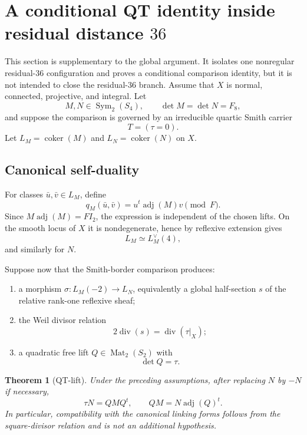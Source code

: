 \documentclass[11pt,reqno]{amsart}
\newtheorem{theorem}{Theorem}[section]
\theoremstyle{remark}
\newcommand{\adj}{\operatorname{adj}}
\newcommand{\Sym}{\operatorname{Sym}}
\newcommand{\divi}{\operatorname{div}}
\begin{document}
\section{A conditional QT identity inside residual distance $36$}\label{sec:QT}
This section is supplementary to the global argument.  It isolates one nonregular residual-$36$ configuration and proves a conditional comparison identity, but it is not intended to close the residual-$36$ branch.  Assume that $X$ is normal, connected, projective, and integral.  Let
\[
M,N\in\Sym_2(S_4),\qquad \det M=\det N=F_8,
\]
and suppose the comparison is governed by an irreducible quartic Smith carrier
\[
T=(\tau=0).
\]
Let $L_M=\operatorname{coker}(M)$ and $L_N=\operatorname{coker}(N)$ on $X$.

\subsection{Canonical self-duality}
For classes $\bar u,\bar v\in L_M$, define
\[
q_M(\bar u,\bar v)=u^t\adj(M)v\pmod F.
\]
Since $M\adj(M)=FI_2$, the expression is independent of the chosen lifts.  On the smooth locus of $X$ it is nondegenerate, hence by reflexive extension gives
\[
L_M\simeq L_M^\vee(4),
\]
and similarly for $N$.

Suppose now that the Smith-border comparison produces:
\begin{enumerate}[label=(\roman*)]
\item a morphism $\sigma:L_M(-2)\to L_N$, equivalently a global half-section $s$ of the relative rank-one reflexive sheaf;
\item the Weil divisor relation
\[
2\divi(s)=\divi(\tau|_X);
\]
\item a quadratic free lift $Q\in\operatorname{Mat}_2(S_2)$ with
\[
\det Q=\tau.
\]
\end{enumerate}

\begin{theorem}[QT-lift]\label{thm:QT}
Under the preceding assumptions, after replacing $N$ by $-N$ if necessary,
\[
\boxed{\tau N=QMQ^t},
\qquad
\boxed{QM=N\adj(Q)^t}.
\]
In particular, compatibility with the canonical linking forms follows from the square-divisor relation and is not an additional hypothesis.
\end{theorem}
\end{document}
